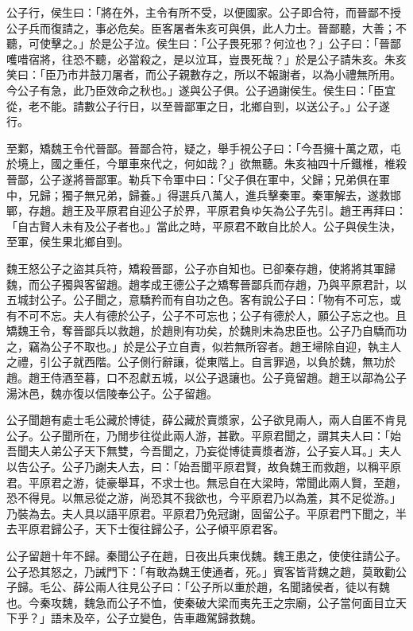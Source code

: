 \begin{pinyinscope}
公子行，侯生曰：「將在外，主令有所不受，以便國家。公子即合符，而晉鄙不授公子兵而復請之，事必危矣。臣客屠者朱亥可與俱，此人力士。晉鄙聽，大善；不聽，可使擊之。」於是公子泣。侯生曰：「公子畏死邪？何泣也？」公子曰：「晉鄙嚄唶宿將，往恐不聽，必當殺之，是以泣耳，豈畏死哉？」於是公子請朱亥。朱亥笑曰：「臣乃市井鼓刀屠者，而公子親數存之，所以不報謝者，以為小禮無所用。今公子有急，此乃臣效命之秋也。」遂與公子俱。公子過謝侯生。侯生曰：「臣宜從，老不能。請數公子行日，以至晉鄙軍之日，北鄉自剄，以送公子。」公子遂行。

至鄴，矯魏王令代晉鄙。晉鄙合符，疑之，舉手視公子曰：「今吾擁十萬之眾，屯於境上，國之重任，今單車來代之，何如哉？」欲無聽。朱亥袖四十斤鐵椎，椎殺晉鄙，公子遂將晉鄙軍。勒兵下令軍中曰：「父子俱在軍中，父歸；兄弟俱在軍中，兄歸；獨子無兄弟，歸養。」得選兵八萬人，進兵擊秦軍。秦軍解去，遂救邯鄲，存趙。趙王及平原君自迎公子於界，平原君負ゆ矢為公子先引。趙王再拜曰：「自古賢人未有及公子者也。」當此之時，平原君不敢自比於人。公子與侯生決，至軍，侯生果北鄉自剄。

魏王怒公子之盜其兵符，矯殺晉鄙，公子亦自知也。已卻秦存趙，使將將其軍歸魏，而公子獨與客留趙。趙孝成王德公子之矯奪晉鄙兵而存趙，乃與平原君計，以五城封公子。公子聞之，意驕矜而有自功之色。客有說公子曰：「物有不可忘，或有不可不忘。夫人有德於公子，公子不可忘也；公子有德於人，願公子忘之也。且矯魏王令，奪晉鄙兵以救趙，於趙則有功矣，於魏則未為忠臣也。公子乃自驕而功之，竊為公子不取也。」於是公子立自責，似若無所容者。趙王埽除自迎，執主人之禮，引公子就西階。公子側行辭讓，從東階上。自言罪過，以負於魏，無功於趙。趙王侍酒至暮，口不忍獻五城，以公子退讓也。公子竟留趙。趙王以鄗為公子湯沐邑，魏亦復以信陵奉公子。公子留趙。

公子聞趙有處士毛公藏於博徒，薛公藏於賣漿家，公子欲見兩人，兩人自匿不肯見公子。公子聞所在，乃閒步往從此兩人游，甚歡。平原君聞之，謂其夫人曰：「始吾聞夫人弟公子天下無雙，今吾聞之，乃妄從博徒賣漿者游，公子妄人耳。」夫人以告公子。公子乃謝夫人去，曰：「始吾聞平原君賢，故負魏王而救趙，以稱平原君。平原君之游，徒豪舉耳，不求士也。無忌自在大梁時，常聞此兩人賢，至趙，恐不得見。以無忌從之游，尚恐其不我欲也，今平原君乃以為羞，其不足從游。」乃裝為去。夫人具以語平原君。平原君乃免冠謝，固留公子。平原君門下聞之，半去平原君歸公子，天下士復往歸公子，公子傾平原君客。

公子留趙十年不歸。秦聞公子在趙，日夜出兵東伐魏。魏王患之，使使往請公子。公子恐其怒之，乃誡門下：「有敢為魏王使通者，死。」賓客皆背魏之趙，莫敢勸公子歸。毛公、薛公兩人往見公子曰：「公子所以重於趙，名聞諸侯者，徒以有魏也。今秦攻魏，魏急而公子不恤，使秦破大梁而夷先王之宗廟，公子當何面目立天下乎？」語未及卒，公子立變色，告車趣駕歸救魏。


\end{pinyinscope}
